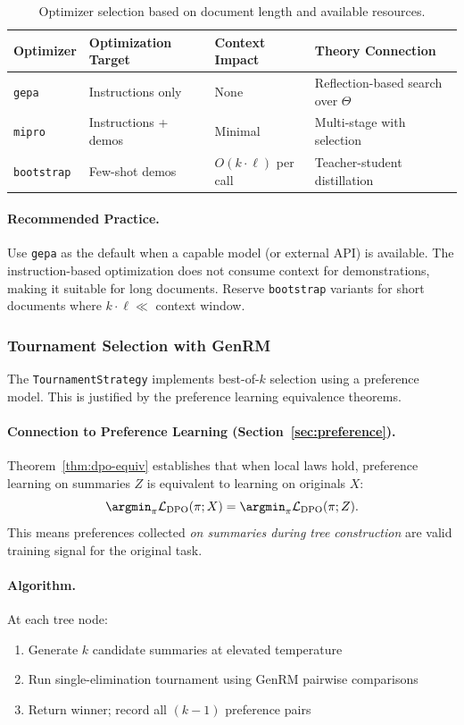 \begin{table}[h]
\centering
\caption{Optimizer selection based on document length and available resources.}
\label{tab:optimizer-theory}
\small
\begin{tabular}{@{}llll@{}}
\toprule
\textbf{Optimizer} & \textbf{Optimization Target} & \textbf{Context Impact} & \textbf{Theory Connection} \\
\midrule
\texttt{gepa} & Instructions only & None & Reflection-based search over $\Theta$ \\
\texttt{mipro} & Instructions + demos & Minimal & Multi-stage with selection \\
\texttt{bootstrap} & Few-shot demos & $O(k \cdot \ell)$ per call & Teacher-student distillation \\
\bottomrule
\end{tabular}
\end{table}

\paragraph{Recommended Practice.}
Use \texttt{gepa} as the default when a capable model (or external API) is available. The instruction-based optimization does not consume context for demonstrations, making it suitable for long documents. Reserve \texttt{bootstrap} variants for short documents where $k \cdot \ell \ll$ context window.

\subsubsection{Tournament Selection with GenRM}

The \texttt{TournamentStrategy} implements best-of-$k$ selection using a preference model. This is justified by the preference learning equivalence theorems.

\paragraph{Connection to Preference Learning (Section~\ref{sec:preference}).}
Theorem~\ref{thm:dpo-equiv} establishes that when local laws hold, preference learning on summaries $Z$ is equivalent to learning on originals $X$:
\[
\argmin_\pi \mathcal{L}_{\text{DPO}}(\pi; X) = \argmin_\pi \mathcal{L}_{\text{DPO}}(\pi; Z).
\]
This means preferences collected \emph{on summaries during tree construction} are valid training signal for the original task.

\paragraph{Algorithm.}
At each tree node:
\begin{enumerate}[nosep]
    \item Generate $k$ candidate summaries at elevated temperature
    \item Run single-elimination tournament using GenRM pairwise comparisons
    \item Return winner; record all $(k-1)$ preference pairs
\end{enumerate}

